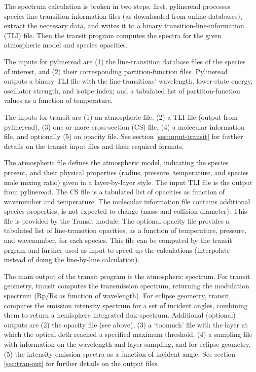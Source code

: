 \documentclass[letterpaper, 12pt]{article}
\begin{document}
The spectrum calculation is broken in two steps: first, pylineread
processes species line-transition information files (as downloaded
from online databases), extract the necessary data, and writes it to a
binary transition-line-information (TLI) file.  Then the transit
program computes the spectra for the given atmospheric model and
species opacities.

The inputs for pylineread are (1) the line-transition database files
of the species of interest, and (2) their corresponding
partition-function files.  Pylineread outputs a binary TLI file with
the line-transitions' wavelength, lower-state energy, oscillator
strength, and isotpe index; and a tabulated list of partition-function
values as a function of temperature.

The inputs for transit are (1) an atmospheric file, (2) a TLI file
(output from pylineread), (3) one or more cross-section (CS) file,
(4) a molecular information file, and optionally (5) an opacity file.
See section \ref{sec:input-transit} for further details on the transit
input files and their required formats.

The atmospheric file defines the atmospheric model, indicating the
species present, and their physical properties (radius, pressure,
temperature, and species mole mixing ratio) given in a layer-by-layer
style.  The input TLI file is the output from pylineread.  The CS
file is a tabulated list of opacities as function of wavenumber
and temperature.  The molecular information file contains additional
species properties, is not expected to change (mass and collision
diameter).  This file is provided by the Transit module.  The optional
opacity file provides a tabulated list of line-transition opacities,
as a function of temperature, pressure, and wavenumber, for each
species.  This file can be computed by the transit prgram and further
used as input to speed up the calculations (interpolate instead of
doing the line-by-line calculation).

The main output of the transit program is the atmospheric spectrum.
For transit geometry, transit computes the transmission spectrum,
returning the modulation spectrum (Rp/Rs as function of wavelength).
For eclipse geometry, transit computes the emission intensity spectrum
for a set of incident angles, combining them to return a hemisphere
integrated flux spectrum.  Additional (optional) outputs are (2) the
opacity file (see above), (3) a `toomuch' file with the layer at which
the optical deth reached a specified maximum threshold, (4) a sampling
file with information on the wavelength and layer sampling, and for
eclipse geometry, (5) the intensity emission spectra as a function of
incident angle.  See section \ref{sec:tran-out} for further details on
the output files.
\end{document}
